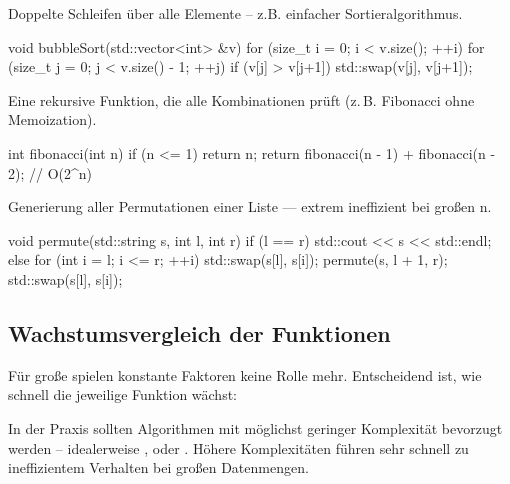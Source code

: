 \begin{tcolorbox}[blue, title={Beispiel 5 — quadratische Komplexität \rCode{$O(n^2)$}}]
    Doppelte Schleifen über alle Elemente – z.B. einfacher Sortieralgorithmus.
\end{tcolorbox}

\begin{cpp}
void bubbleSort(std::vector<int> &v) {
    for (size_t i = 0; i < v.size(); ++i)
        for (size_t j = 0; j < v.size() - 1; ++j)
            if (v[j] > v[j+1])
                std::swap(v[j], v[j+1]);
}
\end{cpp}

\begin{tcolorbox}[blue, title={Beispiel 6 — exponentielle Komplexität \rCode{$O(2^n)$}}]
    Eine rekursive Funktion, die alle Kombinationen prüft (z.\,B. Fibonacci ohne Memoization).
\end{tcolorbox}

\begin{cpp}
int fibonacci(int n) {
    if (n <= 1) return n;
    return fibonacci(n - 1) + fibonacci(n - 2); // O(2^n)
}
\end{cpp}

\begin{tcolorbox}[blue, title={Beispiel 7 — Fakultätskomplexität \rCode{$O(n!)$}}]
    Generierung aller Permutationen einer Liste — extrem ineffizient bei großen n.
\end{tcolorbox}

\begin{cpp}
void permute(std::string s, int l, int r) {
    if (l == r) std::cout << s << std::endl;
    else {
        for (int i = l; i <= r; ++i) {
            std::swap(s[l], s[i]);
            permute(s, l + 1, r);
            std::swap(s[l], s[i]);
        }
    }
}
\end{cpp}

\subsection{Wachstumsvergleich der Funktionen}

Für große  spielen konstante Faktoren keine Rolle mehr.  
Entscheidend ist, wie schnell die jeweilige Funktion wächst:

\begin{center}
\end{center}

\begin{tcolorbox}[red, title={Fazit}]
    In der Praxis sollten Algorithmen mit möglichst geringer Komplexität bevorzugt werden – 
    idealerweise ,  oder .  
    Höhere Komplexitäten führen sehr schnell zu ineffizientem Verhalten bei großen Datenmengen.
\end{tcolorbox}
